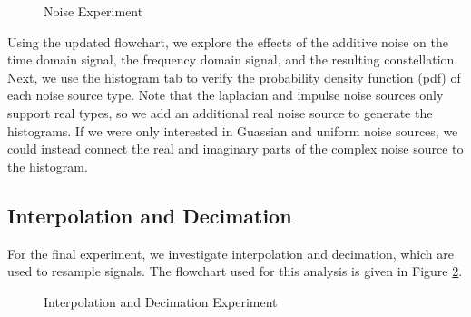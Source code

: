 \documentclass{article}
\begin{document}
\begin{figure}[H]
	\centerline{}
	\caption{Noise Experiment}
	\label{fig::noise_experiment}
\end{figure}

Using the updated flowchart, we explore the effects of the additive noise on the time domain signal, the frequency domain signal, and the resulting constellation. Next, we use the histogram tab to verify the probability density function (pdf) of each noise source type. Note that the laplacian and impulse noise sources only support real types, so we add an additional real noise source to generate the histograms. If we were only interested in Guassian and uniform noise sources, we could instead connect the real and imaginary parts of the complex noise source to the histogram. 


\subsection{Interpolation and Decimation}

For the final experiment, we investigate interpolation and decimation, which are used to resample signals. The flowchart used for this analysis is given in Figure \ref{fig::interpolation_and_decimation_experiment}.

\begin{figure}[H]
	\centerline{}
	\caption{Interpolation and Decimation Experiment}
	\label{fig::interpolation_and_decimation_experiment}
\end{figure}
\end{document}
